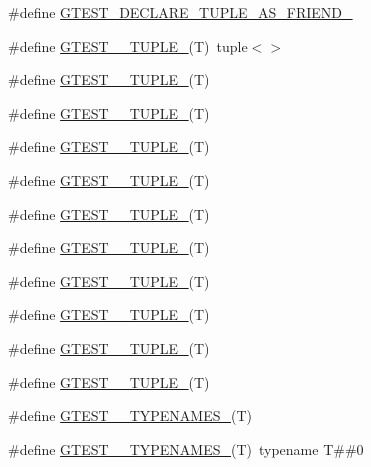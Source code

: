 \begin{DoxyCompactItemize}
\item 
\#define \hyperlink{fused-src_2gtest_2gtest_8h_a2b20671273f514a88a6e9b8328e5f257}{\-G\-T\-E\-S\-T\-\_\-\-D\-E\-C\-L\-A\-R\-E\-\_\-\-T\-U\-P\-L\-E\-\_\-\-A\-S\-\_\-\-F\-R\-I\-E\-N\-D\-\_\-}
\item 
\#define \hyperlink{fused-src_2gtest_2gtest_8h_acecddf48fa29ec4b0199d5a467e89778}{\-G\-T\-E\-S\-T\-\_\-\_\-\-T\-U\-P\-L\-E\-\_\-}(\-T)~tuple$<$$>$
\item 
\#define \hyperlink{fused-src_2gtest_2gtest_8h_a544374090885c4127adc2c618570323c}{\-G\-T\-E\-S\-T\-\_\-\_\-\-T\-U\-P\-L\-E\-\_\-}(\-T)
\item 
\#define \hyperlink{fused-src_2gtest_2gtest_8h_a93229c3f009273c73eca237b4d19f326}{\-G\-T\-E\-S\-T\-\_\-\_\-\-T\-U\-P\-L\-E\-\_\-}(\-T)
\item 
\#define \hyperlink{fused-src_2gtest_2gtest_8h_af2c3eab3f1a5197b408fce44eb3ed9da}{\-G\-T\-E\-S\-T\-\_\-\_\-\-T\-U\-P\-L\-E\-\_\-}(\-T)
\item 
\#define \hyperlink{fused-src_2gtest_2gtest_8h_a3625feb24d5e6eb9926fd558e4a2e3ff}{\-G\-T\-E\-S\-T\-\_\-\_\-\-T\-U\-P\-L\-E\-\_\-}(\-T)
\item 
\#define \hyperlink{fused-src_2gtest_2gtest_8h_a64e6f4a4cf55f62cde94066c6d5d5c74}{\-G\-T\-E\-S\-T\-\_\-\_\-\-T\-U\-P\-L\-E\-\_\-}(\-T)
\item 
\#define \hyperlink{fused-src_2gtest_2gtest_8h_a53f36c86a979ed8285bf3c6f82f16483}{\-G\-T\-E\-S\-T\-\_\-\_\-\-T\-U\-P\-L\-E\-\_\-}(\-T)
\item 
\#define \hyperlink{fused-src_2gtest_2gtest_8h_a8987baf82ee028d1d778447413a02c0c}{\-G\-T\-E\-S\-T\-\_\-\_\-\-T\-U\-P\-L\-E\-\_\-}(\-T)
\item 
\#define \hyperlink{fused-src_2gtest_2gtest_8h_a2bc36d1a71a551e6cda2ac5504fb7ce3}{\-G\-T\-E\-S\-T\-\_\-\_\-\-T\-U\-P\-L\-E\-\_\-}(\-T)
\item 
\#define \hyperlink{fused-src_2gtest_2gtest_8h_a1a81c17bfe3cdceb4d56b15985a44a7e}{\-G\-T\-E\-S\-T\-\_\-\_\-\-T\-U\-P\-L\-E\-\_\-}(\-T)
\item 
\#define \hyperlink{fused-src_2gtest_2gtest_8h_a275e7bcd84299cc44b9c1dba971951c4}{\-G\-T\-E\-S\-T\-\_\-\_\-\-T\-U\-P\-L\-E\-\_\-}(\-T)
\item 
\#define \hyperlink{fused-src_2gtest_2gtest_8h_ac6784ade57659fbc58baa03c265ca0ac}{\-G\-T\-E\-S\-T\-\_\-\_\-\-T\-Y\-P\-E\-N\-A\-M\-E\-S\-\_\-}(\-T)
\item 
\#define \hyperlink{fused-src_2gtest_2gtest_8h_a2042d8e9fefb83752b1028d640adfaf2}{\-G\-T\-E\-S\-T\-\_\-\_\-\-T\-Y\-P\-E\-N\-A\-M\-E\-S\-\_\-}(\-T)~typename \-T\#\#0
$$
\end{DoxyCompactItemize}
